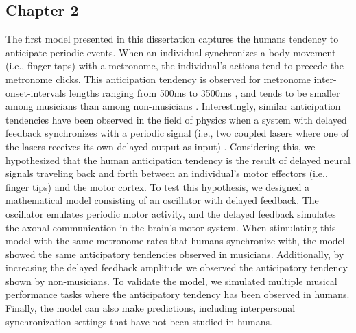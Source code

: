 \documentclass{report}
\begin{document}
\subsection{Chapter 2}
The first model presented in this dissertation captures the humans tendency to anticipate periodic events. When an individual synchronizes a body movement (i.e., finger taps) with a metronome, the individual's actions tend to precede the metronome clicks. This anticipation tendency is observed for metronome inter-onset-intervals lengths ranging from 500ms to 3500ms \cite{repp2005sensorimotor}, and tends to be smaller among musicians than among non-musicians \cite{repp2007tapping}. Interestingly, similar anticipation tendencies have been observed in the field of physics when a system with delayed feedback synchronizes with a periodic signal (i.e., two coupled lasers where one of the lasers receives its own delayed output as input) \cite{stepp2010strong}. Considering this, we hypothesized that the human anticipation tendency is the result of delayed neural signals traveling back and forth between an individual's motor effectors (i.e., finger tips) and the motor cortex. To test this hypothesis, we designed a mathematical model consisting of an oscillator with delayed feedback. The oscillator emulates periodic motor activity, and the delayed feedback simulates the axonal communication in the brain's motor system. When stimulating this model with the same metronome rates that humans synchronize with, the model showed the same anticipatory tendencies observed in musicians. Additionally, by increasing the delayed feedback amplitude we observed the anticipatory tendency shown by non-musicians. To validate the model, we simulated multiple musical performance tasks where the anticipatory tendency has been observed in humans. Finally, the model can also make predictions, including interpersonal synchronization settings that have not been studied in humans.
\end{document}

